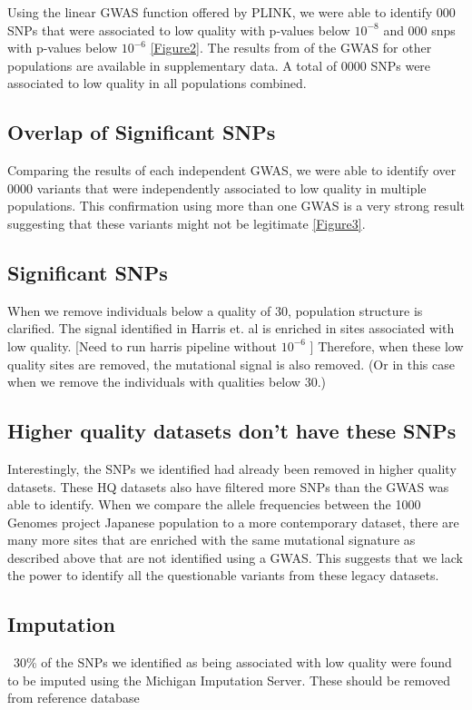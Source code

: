 \documentclass[12pt]{amsart}
\begin{document}
Using the linear GWAS function offered by PLINK, we were able to identify 000 SNPs that were associated to low quality with  p-values below $10^{-8}$ and 000 snps with p-values below $10^{-6}$ \ref{Figure2}. 
The results from of the GWAS for other populations are available in supplementary data. 
A total of 0000 SNPs were associated to low quality in all populations combined.

\subsection{Overlap of Significant SNPs}
Comparing the results of each independent GWAS, we were able to identify over 0000 variants that were independently associated to low quality in multiple populations. This confirmation using more than one GWAS is a very strong result suggesting that these variants might not be legitimate  \ref{Figure3}. 

\subsection{Significant SNPs}
When we remove individuals below a quality of 30, population structure is clarified. 
The signal identified in Harris et. al is enriched in sites associated with low quality. [Need to run harris pipeline without $10^{-6}$ ]
Therefore, when these low quality sites are removed, the mutational signal is also removed. (Or in this case when we remove the individuals with qualities below 30.)

\subsection{Higher quality datasets don't have these SNPs}

Interestingly, the SNPs we identified had already been removed in higher quality datasets. 
These HQ datasets also have filtered more SNPs than the GWAS was able to identify. 
When we compare the allele frequencies between the 1000 Genomes project Japanese population to a more contemporary dataset, there are many more sites that are enriched with the same mutational signature as described above that are not identified using a GWAS. 
This suggests that we lack the power to identify all the questionable variants from these legacy datasets. 
\subsection{Imputation}
~30\% of the SNPs we identified as being associated with low quality were found to be imputed using the Michigan Imputation Server. These  should be removed from reference database
\end{document}
